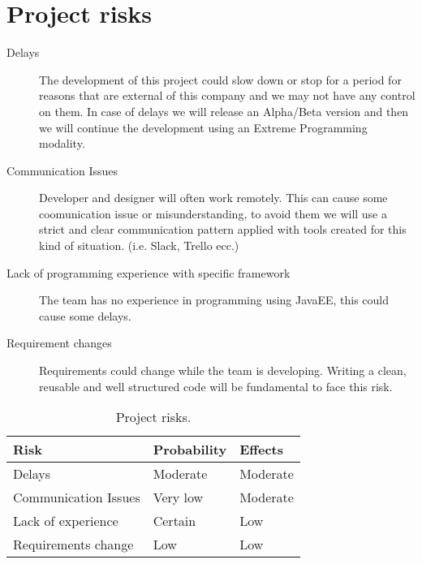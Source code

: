 \section{Project risks}

\begin{description}

\item[Delays] The development of this project could slow down or stop for a period for reasons that are external of this company and we may not have any control on them. In case of delays we will release an Alpha/Beta version and then we will continue the development using an Extreme Programming modality.

\item[Communication Issues] Developer and designer will often work remotely. This can cause some coomunication issue or misunderstanding, to avoid them we will use a strict and clear communication pattern applied with tools created for this kind of situation. (i.e. Slack, Trello ecc.)

\item[Lack of programming experience with specific framework] The team has no experience in programming using JavaEE, this could cause some delays.

\item[Requirement changes] Requirements could change while the team is developing. Writing a clean, reusable and well structured code will be fundamental to face this risk.

\end{description}
\begin{table}[p]
\centering
    \begin{tabular}{| l | l | l |}
        \hline
        \textbf{Risk}           & \textbf{Probability}  & \textbf{Effects}  \\
        \hline
        Delays                  & Moderate                  & Moderate          \\
        \hline
        Communication Issues   & Very low                   & Moderate          \\
        \hline
        Lack of experience      & Certain               & Low          \\
        \hline
        Requirements change     & Low            & Low          \\
        \hline
    \end{tabular}
    \caption{Project risks.}
    \label{tab:project-risks}
\end{table}